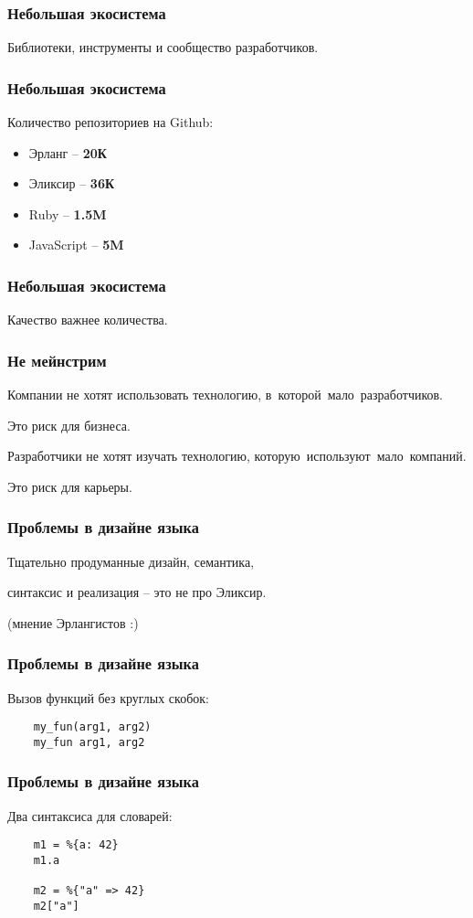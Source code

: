 \documentclass[10pt]{beamer}
\begin{document}
\begin{frame}
  \frametitle{Небольшая экосистема}
  Библиотеки, инструменты и сообщество разработчиков.
\end{frame}

\begin{frame}
  \frametitle{Небольшая экосистема}
  Количество репозиториев на Github:
  \begin{itemize}
  \item Эрланг -- \textbf{20К}
  \item Эликсир -- \textbf{36К}
  \item Ruby -- \textbf{1.5M}
  \item JavaScript -- \textbf{5M}
  \end{itemize}
\end{frame}

\begin{frame}
  \frametitle{Небольшая экосистема}
  Качество важнее количества.
\end{frame}

\begin{frame}
  \frametitle{Не мейнстрим}
  Компании не хотят использовать технологию, в~которой~мало~разработчиков.
  \par \bigskip
  Это риск для бизнеса.
  \par \bigskip
  Разработчики не хотят изучать технологию, которую~используют~мало~компаний.
  \par \bigskip
  Это риск для карьеры.
\end{frame}

\begin{frame}
  \frametitle{Проблемы в дизайне языка}
  Тщательно продуманные дизайн, семантика,
  \par \bigskip
  синтаксис и реализация -- это не про Эликсир.
  \par \bigskip
  (мнение Эрлангистов :)
\end{frame}

\begin{frame}[fragile]
  \frametitle{Проблемы в дизайне языка}
  Вызов функций без круглых скобок:
  \begin{lstlisting}
    my_fun(arg1, arg2)
    my_fun arg1, arg2
  \end{lstlisting}
\end{frame}

\begin{frame}[fragile]
  \frametitle{Проблемы в дизайне языка}
  Два синтаксиса для словарей:
  \begin{lstlisting}
    m1 = %{a: 42}
    m1.a

    m2 = %{"a" => 42}
    m2["a"]
  \end{lstlisting}
\end{frame}
\end{document}

